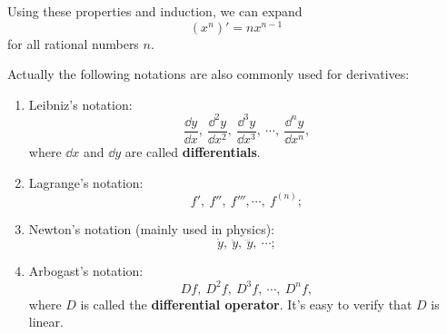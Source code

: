 \documentclass[a4paper]{ctexart}
\begin{document}
	\begin{myrmk}
		Using these properties and induction, we can expand
		\[
		\left( x^n\right)' = n x^{n-1}
		\]
		for all rational numbers $n$.
	\end{myrmk}
	\begin{mynot}
		Actually the following notations are also commonly used for derivatives:
		\begin{enumerate}
			\item Leibniz's notation:
			\[
			\frac{\dd y}{\dd x},\ \frac{\dd^2 y}{\dd x^2},\ \frac{\dd^3 y}{\dd x^3},\ \cdots,\ \frac{\dd^n y}{\dd x^n},
			\]
			where $\dd x$ and $\dd y$ are called \textbf{differentials}.
			\item Lagrange's notation:
			\[
			f',\ f'',\ f''',\cdots,\ f^{(n)};
			\]
			\item Newton's notation (mainly used in physics):
			\[
			\dot{y},\ \ddot{y},\ \dddot{y},\ \cdots;
			\]
			\item Arbogast's notation:
			\[
			Df,\ D^2f,\ D^3f,\ \cdots,\ D^n f,
			\]
			where $D$ is called the \textbf{differential operator}. It's easy to verify that $D$ is linear.
		\end{enumerate}
	\end{mynot}
\end{document}
